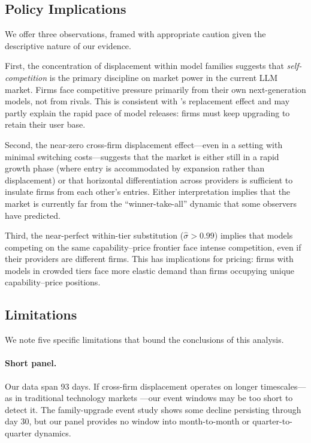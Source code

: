 \documentclass[11pt, a4paper]{article}
\begin{document}
\subsection{Policy Implications}

We offer three observations, framed with appropriate caution given the descriptive nature of our evidence.

First, the concentration of displacement within model families suggests that \emph{self-competition} is the primary discipline on market power in the current LLM market. Firms face competitive pressure primarily from their own next-generation models, not from rivals. This is consistent with \citet{arrow1962economic}'s replacement effect and may partly explain the rapid pace of model releases: firms must keep upgrading to retain their user base.

Second, the near-zero cross-firm displacement effect---even in a setting with minimal switching costs---suggests that the market is either still in a rapid growth phase (where entry is accommodated by expansion rather than displacement) or that horizontal differentiation across providers is sufficient to insulate firms from each other's entries. Either interpretation implies that the market is currently far from the ``winner-take-all'' dynamic that some observers have predicted.

Third, the near-perfect within-tier substitution ($\hat{\sigma} > 0.99$) implies that models competing on the same capability--price frontier face intense competition, even if their providers are different firms. This has implications for pricing: firms with models in crowded tiers face more elastic demand than firms occupying unique capability--price positions.

\subsection{Limitations}

We note five specific limitations that bound the conclusions of this analysis.

\paragraph{Short panel.} Our data span 93 days. If cross-firm displacement operates on longer timescales---as in traditional technology markets \citep{bresnahan1999technological}---our event windows may be too short to detect it. The family-upgrade event study shows some decline persisting through day 30, but our panel provides no window into month-to-month or quarter-to-quarter dynamics.
\end{document}
